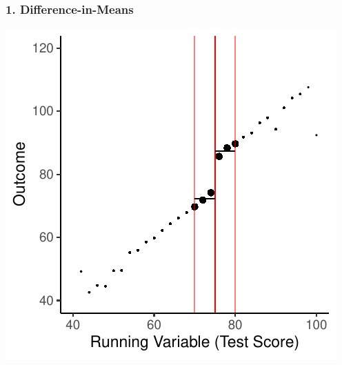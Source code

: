 \documentclass[xcolor=x11names,compress]{beamer}\usepackage[]{graphicx}\usepackage[]{color}
\makeatletter
\def\maxwidth{ %
  \ifdim\Gin@nat@width>\linewidth
    \linewidth
  \else
    \Gin@nat@width
  \fi
}
\newenvironment{knitrout}{}{} %
\renewcommand{\(}{\begin{columns}}
\renewcommand{\)}{\end{columns}}
\newcommand{\<}[1]{\begin{column}{#1}}
\renewcommand{\>}{\end{column}}
\makeatother
\begin{document}
\begin{frame}
\frametitle{1. Difference-in-Means}
\begin{center}
\begin{knitrout}
\color{fgcolor}
\includegraphics[width=\maxwidth]{figure/chart3-1} 

\end{knitrout}
\end{center}
\end{frame}
\end{document}
